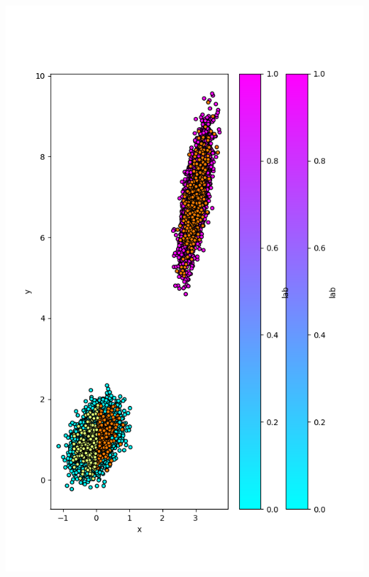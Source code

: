 \documentclass{article}
\begin{document}
\begin{enumerate}
  \noindent\includegraphics[scale=0.5]{plot_20}

\end{enumerate}
\end{document}

